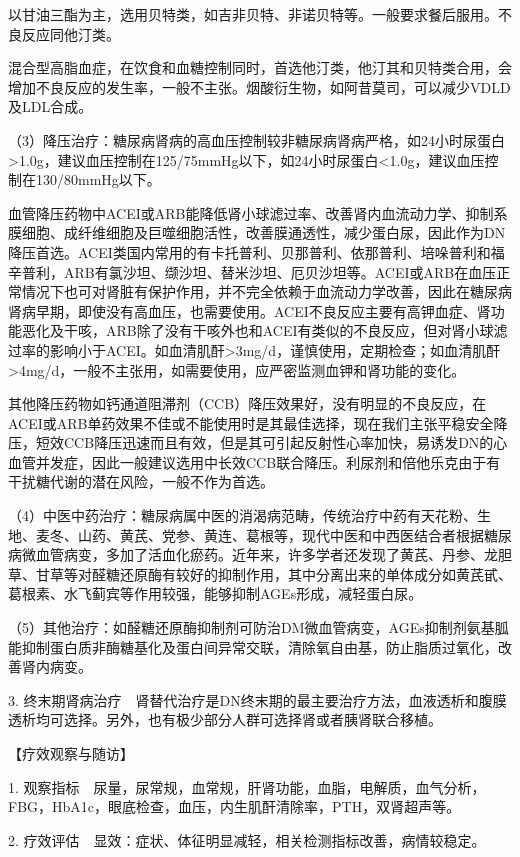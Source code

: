 以甘油三酯为主，选用贝特类，如吉非贝特、非诺贝特等。一般要求餐后服用。不良反应同他汀类。

混合型高脂血症，在饮食和血糖控制同时，首选他汀类，他汀其和贝特类合用，会增加不良反应的发生率，一般不主张。烟酸衍生物，如阿昔莫司，可以减少VDLD及LDL合成。

（3）降压治疗：糖尿病肾病的高血压控制较非糖尿病肾病严格，如24小时尿蛋白\textgreater{}1.0g，建议血压控制在125/75mmHg以下，如24小时尿蛋白\textless{}1.0g，建议血压控制在130/80mmHg以下。

血管降压药物中ACEI或ARB能降低肾小球滤过率、改善肾内血流动力学、抑制系膜细胞、成纤维细胞及巨噬细胞活性，改善膜通透性，减少蛋白尿，因此作为DN降压首选。ACEI类国内常用的有卡托普利、贝那普利、依那普利、培哚普利和福辛普利，ARB有氯沙坦、缬沙坦、替米沙坦、厄贝沙坦等。ACEI或ARB在血压正常情况下也可对肾脏有保护作用，并不完全依赖于血流动力学改善，因此在糖尿病肾病早期，即使没有高血压，也需要使用。ACEI不良反应主要有高钾血症、肾功能恶化及干咳，ARB除了没有干咳外也和ACEI有类似的不良反应，但对肾小球滤过率的影响小于ACEI。如血清肌酐\textgreater{}3mg/d，谨慎使用，定期检查；如血清肌酐\textgreater{}4mg/d，一般不主张用，如需要使用，应严密监测血钾和肾功能的变化。

其他降压药物如钙通道阻滞剂（CCB）降压效果好，没有明显的不良反应，在ACEI或ARB单药效果不佳或不能使用时是其最佳选择，现在我们主张平稳安全降压，短效CCB降压迅速而且有效，但是其可引起反射性心率加快，易诱发DN的心血管并发症，因此一般建议选用中长效CCB联合降压。利尿剂和倍他乐克由于有干扰糖代谢的潜在风险，一般不作为首选。

（4）中医中药治疗：糖尿病属中医的消渴病范畴，传统治疗中药有天花粉、生地、麦冬、山药、黄芪、党参、黄连、葛根等，现代中医和中西医结合者根据糖尿病微血管病变，多加了活血化瘀药。近年来，许多学者还发现了黄芪、丹参、龙胆草、甘草等对醛糖还原酶有较好的抑制作用，其中分离出来的单体成分如黄芪甙、葛根素、水飞蓟宾等作用较强，能够抑制AGEs形成，减轻蛋白尿。

（5）其他治疗：如醛糖还原酶抑制剂可防治DM微血管病变，AGEs抑制剂氨基胍能抑制蛋白质非酶糖基化及蛋白间异常交联，清除氧自由基，防止脂质过氧化，改善肾内病变。

3.
终末期肾病治疗　肾替代治疗是DN终末期的最主要治疗方法，血液透析和腹膜透析均可选择。另外，也有极少部分人群可选择肾或者胰肾联合移植。

【疗效观察与随访】

1.
观察指标　尿量，尿常规，血常规，肝肾功能，血脂，电解质，血气分析，FBG，HbA1c，眼底检查，血压，内生肌酐清除率，PTH，双肾超声等。

2. 疗效评估　显效：症状、体征明显减轻，相关检测指标改善，病情较稳定。


